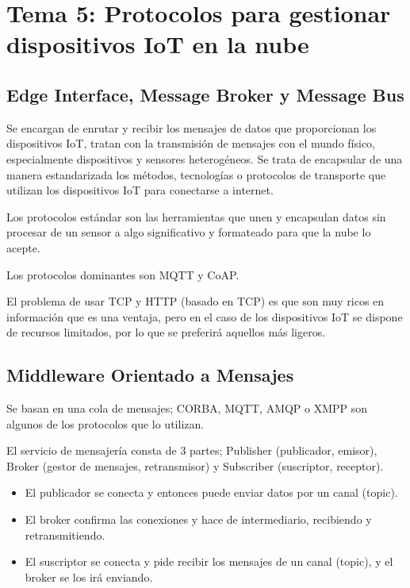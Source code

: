 \documentclass[12pt, twoside, openright]{report} %
\begin{document}
\chapter{Tema 5: Protocolos para gestionar dispositivos IoT en la nube}

\section{Edge Interface, Message Broker y Message Bus}

Se encargan de enrutar y recibir los mensajes de datos que proporcionan los dispositivos IoT, tratan con la transmisión de mensajes con el mundo físico, especialmente dispositivos y sensores heterogéneos. Se trata de encapsular de una manera estandarizada los métodos, tecnologías o protocolos de transporte que utilizan los dispositivos IoT para conectarse a internet.

Los protocolos estándar son las herramientas que unen y encapsulan datos sin procesar de un sensor a algo significativo y formateado para que la nube lo acepte.

Los protocolos dominantes son MQTT y CoAP.

El problema de usar TCP y HTTP (basado en TCP) es que son muy ricos en información que es una ventaja, pero en el caso de los dispositivos IoT se dispone de recursos limitados, por lo que se preferirá aquellos más ligeros.

\section{Middleware Orientado a Mensajes}

Se basan en una cola de mensajes; CORBA, MQTT, AMQP o XMPP son algunos de los protocolos que lo utilizan.

El servicio de mensajería consta de 3 partes; Publisher (publicador, emisor), Broker (gestor de mensajes, retransmisor) y Subscriber (suscriptor, receptor).
\begin{itemize}
	\item El publicador se conecta y entonces puede enviar datos por un canal (topic).
	\item El broker confirma las conexiones y hace de intermediario, recibiendo y retransmitiendo.
	\item El suscriptor se conecta y pide recibir los mensajes de un canal (topic), y el broker se los irá enviando.
\end{itemize}
\end{document}
